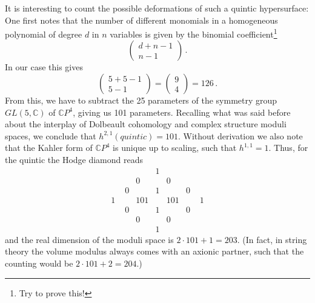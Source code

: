 \documentclass[12pt]{article}
\newcommand{\be}{\begin{equation}}
\newcommand{\ee}{\end{equation}}
\numberwithin{equation}{section}
\begin{document}
It is interesting to count the possible deformations of such a quintic hypersurface: One first notes that the number of different monomials in a homogeneous polynomial of degree $d$ in $n$ variables is given by the binomial coefficient\footnote{Try to prove this!}
\be
\left(\begin{array}{c} d+n-1 \\ n-1 \end{array}\right)\,.
\ee
In our case this gives
\be
\left(\begin{array}{c} 5+5-1 \\ 5-1 \end{array}\right)=
\left(\begin{array}{c} 9 \\ 4 \end{array}\right)=126\,.
\ee
From this, we have to subtract the 25 parameters of the symmetry group $GL(5,\mathbb{C})$ of $\mathbb{C}P^4$, giving us 101 parameters. Recalling what was said before about the interplay of Dolbeault cohomology and complex structure moduli spaces, we conclude that $h^{2,1}(quintic)=101$. Without derivation we also note that the Kahler form of $\mathbb{C}P^4$ is unique up to scaling, such that $h^{1,1}=1$. Thus, for the quintic the Hodge diamond reads
\be
\begin{array}{ccccccc}
&&&1&&& 
\\ 
&&0&&0&&
\\
&0&&1&&0&
\\
1\,\,&&101&&101&&\,\,1
\\
&0&&1&&0&
\\
&&0&&0&&
\\
&&&1&&& 
\end{array}
\ee
and the real dimension of the moduli space is $2\cdot 101+1=203$. (In fact, in string theory the volume modulus always comes with an axionic partner, such that the counting would be $2\cdot 101+2=204$.)
\end{document}
